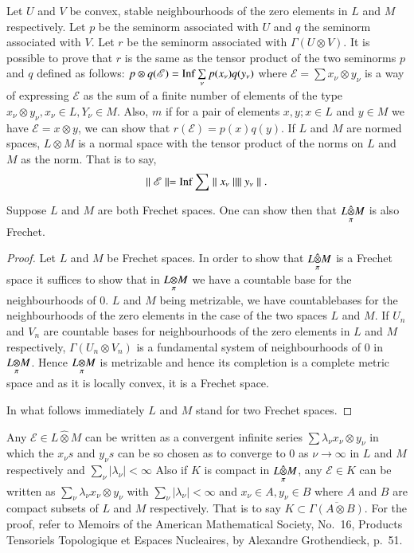  Let $U$ and $V$ be convex, stable
neighbourhoods of the zero elements in $L$ and $M$ respectively. Let
$p$ be the seminorm associated with $U$ and $q$ the seminorm
associated with $V$. Let $r$ be the seminorm associated with $\Gamma
(U \otimes V)$. It is possible to prove that $r$ is the same as the
tensor product of the two seminorms $p$ and $q$ defined as follows: $p
\otimes q (\mathscr{E})= \operatorname{Inf} \sum\limits_\nu p(x_\nu)q(y_\nu)$ where
$\mathscr{E}= \sum x_\nu \otimes y_\nu$ is a way of expressing
$\mathscr{E}$ as the sum of a finite number of elements of the type
$x_\nu \otimes y_\nu , x_\nu \in L, Y_\nu \in M$. Also, $m$ if for a
pair of elements $x, y; x \in L$ and $y \in M$ we have $\mathscr{E} =
x \otimes y$, we can show that $r(\mathscr{E})=p(x) q(y)$. If $L$ and
$M$ are normed spaces, $L \otimes M$ is a normal space with the tensor
product of the norms on $L$ and $M$ as the norm. That is to say, 
$$
\parallel \mathscr{E} \parallel= \operatorname{Inf} \sum \parallel x_\nu \parallel
\parallel y_\nu \parallel.
$$

Suppose $L$ and $M$ are both Frechet spaces. One can show then that 
$\fohprod{L}{M}{\pi}$ is also Frechet. 

\begin{proof}
Let $L$ and $M$ be Frechet spaces. In order to show that 
$\fohprod{L}{M}{\pi}$ is a Frechet space it suffices to
show that in $\foprod{L}{M}{\pi}$ we have a countable base
for the neighbourhoods of $0$. $L$ and $M$ being metrizable, we have
countable\pageoriginale bases for the neighbourhoods of the zero
elements in the case of the two spaces $L$ and $M$. If $U_n$ and $V_n$
are countable bases for neighbourhoods of the zero elements in $L$ and
$M$ respectively, $\Gamma (U_n \otimes V_n)$ is a fundamental system
of neighbourhoods of $0$ in $\foprod{L}{M}{\pi}$. Hence 
$\foprod{L}{M}{\pi}$ is metrizable and hence its completion is a
complete metric space and as it is locally convex, it is a Frechet
space.

In what follows immediately $L$ and $M$ stand for two Frechet spaces.   
\end{proof}

\begin{prop}\label{chap13:prop13.2}
Any $\mathscr{E} \in L \hat{\otimes}M$ can be written as a convergent
infinite series $\sum \lambda_\nu x_\nu \otimes y_\nu$ in which the
$x_\nu s$ and $y_\nu s$ can be so chosen as to converge to $0$ as
$\nu \to \infty$ in $L$ and $M$ respectively and $\sum\limits_\nu
|\lambda_\nu| < \infty$ Also if $K$ is compact in
$\fohprod{L}{M}{\pi}$, any $\mathscr{E} \in K$ can be
written as $\sum\limits_\nu \lambda_\nu x_\nu \otimes y_\nu$ with
$\sum\limits_\nu |\lambda_\nu | < \infty$ and $x_\nu \in A, y_\nu \in
B$ where $A$ and $B$ are compact subsets of $L$ and $M$
respectively. That is to say $K\subset\overline{\Gamma(A \otimes B)}$. For
the proof, refer to Memoirs of the American Mathematical Society,
No.~16, Products Tensoriels Topologique et Espaces Nucleaires, by
Alexandre Grothendieck, p.~51.
\end{prop}



